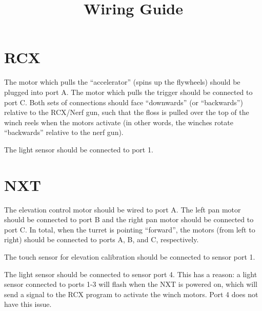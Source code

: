 \documentclass{article}
\title{Wiring Guide}
\author{}
\date{}
\begin{document}
	\maketitle

	\section{RCX}
	The motor which pulls the ``accelerator'' (spins up the flywheels) should be plugged into port A.
	The motor which pulls the trigger should be connected to port C.
	Both sets of connections should face ``downwards'' (or ``backwards'') relative to the RCX/Nerf gun, such that the floss is pulled over the top of the winch reels
	when the motors activate (in other words, the winches rotate ``backwards'' relative to the nerf gun).

	The light sensor should be connected to port 1.

	\section{NXT}
	The elevation control motor should be wired to port A.
	The left pan motor should be connected to port B and the right pan motor should be connected to port C.
	In total, when the turret is pointing ``forward'', the motors (from left to right) should be connected to ports A, B, and C, respectively.

	The touch sensor for elevation calibration should be connected to sensor port 1.

	The light sensor should be connected to sensor port 4.
	This has a reason: a light sensor connected to ports 1-3 will flash when the NXT is powered on, which will send a signal to the RCX program to activate the winch motors.
	Port 4 does not have this issue.
\end{document}
